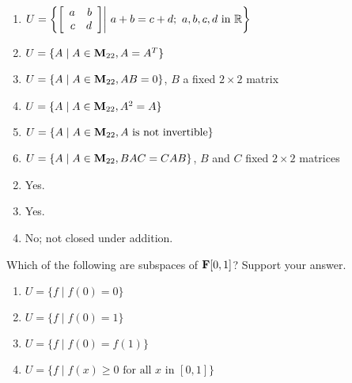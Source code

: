 \begin{multicols}{2}
\begin{ex}
\begin{enumerate}[label={\alph*.}]
\item $U = \left\{
\left[ \begin{array}{rr}
a & b \\
c & d
\end{array} \right]
\middle|\ a + b = c + d;\ a, b, c, d \mbox{ in } \mathbb{R} \right\}$

\item $U = \{A \mid A \in \textbf{M}_{22}, A = A^{T}\}$

\item $U = \{A \mid A \in \textbf{M}_{22}, AB = 0\}$, $B$ a fixed $2 \times 2$ matrix

\item $U = \{A \mid A \in \textbf{M}_{22}, A^{2} = A\}$

\item $U = \{A \mid A \in \textbf{M}_{22}, A \mbox{ is not invertible}\}$

\item $U = \{A \mid A \in \textbf{M}_{22}, BAC = CAB\}$, $B$ and $C$ fixed $2 \times 2$ matrices

\end{enumerate}
\begin{sol}
\begin{enumerate}[label={\alph*.}]
\setcounter{enumi}{1}
\item  Yes.

\setcounter{enumi}{3}
\item  Yes.

\setcounter{enumi}{5}
\item  No; not closed under addition.

\end{enumerate}
\end{sol}
\end{ex}

\begin{ex}
Which of the following are subspaces of $\textbf{F}[0, 1]$? Support your answer.

\begin{enumerate}[label={\alph*.}]
\item $U = \{f \mid f(0) = 0\}$

\item $U = \{f \mid f(0) = 1\}$

\item $U = \{f \mid f(0) = f(1)\}$

\item $U = \{f \mid f(x) \geq 0 \mbox{ for all } x \mbox{ in } [0, 1]\}$


\end{enumerate}
\end{ex}
\end{multicols}
